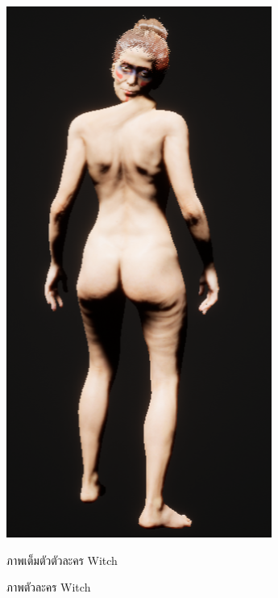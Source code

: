 \begin{figure}
\begin{subcaptionblock}{.4\textwidth}
    \includegraphics[width=.8\linewidth]{./img/characters/witch_full.png}
    \caption{ภาพเต็มตัวตัวละคร Witch}\label{ภาพตัวเต็มตัวละคร Witch}
  \end{subcaptionblock}%
  \caption{ภาพตัวละคร Witch}\label{fig:witch}
\end{figure}

